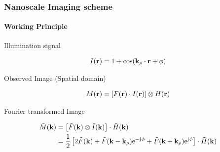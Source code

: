 \documentclass[mathserif,18pt,xcolor=table,c]{beamer}
\begin{document}
  \begin{frame}[t]
    \frametitle{Nanoscale Imaging scheme}
    \framesubtitle{Working Principle}
    \begin{outline}[itemize]
      \1 Illumination signal
    \end{outline}
    \begin{equation} \nonumber
      I(\mathbf{r}) = 1 + \cos(\mathbf{k}_{\rho} \cdot \mathbf{r} + \phi)
      \label{eq:intensity}
    \end{equation} \vspace*{-.5cm}
    \begin{outline}[itemize]
      \1 Observed Image (Spatial domain)
    \end{outline}
    \begin{equation} \nonumber
      M(\mathbf{r}) = \left[ F(\mathbf{r}) \cdot I(\mathbf{r}) \right] \otimes H(\mathbf{r})
      \label{eq:m_spatial_image}
    \end{equation} \vspace*{-.5cm}
    \begin{outline}[itemize]
      \1 Fourier transformed Image
    \end{outline}
    \begin{equation} \nonumber
      \begin{split}
        \tilde{M}(\mathbf{k}) &= \left[ \tilde{F}(\mathbf{k}) \otimes \tilde{I}(\mathbf{k}) \right] \cdot \tilde{H}(\mathbf{k}) \\
        &= \frac{1}{2} \left[ 2\tilde{F}(\mathbf{k}) + \tilde{F}(\mathbf{k} - \mathbf{k}_{\rho}) \mathrm{e}^{- \mathrm{j}\mkern1mu \phi} + \tilde{F}(\mathbf{k} + \mathbf{k}_{\rho}) \mathrm{e}^{\mathrm{j}\mkern1mu \phi} \right] \cdot \tilde{H}(\mathbf{k})
      \end{split}
      \label{eq:m_ft}
    \end{equation}
  \end{frame}
\end{document}
